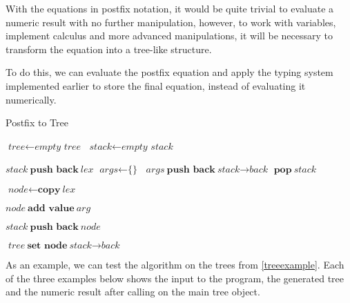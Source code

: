 \documentclass[12pt]{article}
\begin{document}
With the equations in postfix notation, it would be quite trivial to evaluate a numeric result with no further manipulation, however, to work with variables, implement calculus and more advanced manipulations, it will be necessary to transform the equation into a tree-like structure.

To do this, we can evaluate the postfix equation and apply the typing system implemented earlier to store the final equation, instead of evaluating it numerically.

\begin{algorithm}
\caption{Postfix to Tree}\label{treegenalg}
\begin{algorithmic}[1]
	\State $\textit{tree} \gets \textit{empty tree}$
	\State $\textit{stack} \gets \textit{empty stack}$
	
			\State $\textit{stack} \ \textbf{push back} \ \textit{lex}$
			\State $\textit{args} \gets \textit{\{\}}$
				\State $\textit{args} \ \textbf{push back} \ \textit{stack} \rightarrow \textit{back}$
				\State $\textbf{pop} \ \textit{stack}$
			\EndFor			
			
			\State $\textit{node} \gets \textbf{copy} \ \textit{lex}$ 
			
				\State $\textit{node} \ \textbf{add value} \ \textit{arg}$
			\EndFor				
			
			\State $\textit{stack} \ \textbf{push back} \ \textit{node}$ 
		\EndIf
	\EndFor
	
	\State $\textit{tree} \ \textbf{set node} \ \textit{stack} \rightarrow \textit{back}$
\EndFunction
\end{algorithmic}
\end{algorithm}

\pagebreak

As an example, we can test the algorithm on the trees from \ref{treeexample}. Each of the three examples below shows the input to the program, the generated tree and the numeric result after calling  on the main tree object.
\end{document}
